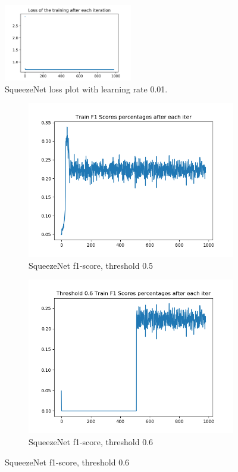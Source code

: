 \begin{figure}[!ht]
\centering
\includegraphics[width=0.5\textwidth]{squeezenet-lazy-1-train-loss.png}
\caption{\label{squeezenet:squeezenet-lazy-1-train-loss}SqueezeNet loss plot with learning rate 0.01.}
\end{figure}

\begin{figure}[!ht]
\centering
\begin{subfigure}{.5\textwidth}
	\centering
	\includegraphics[width=1\linewidth]{squeezenet-lazy-1-train-scores-f1.png}
	\caption{\label{squeezenet:squeezenet-lazy-1-train-scores-f1}SqueezeNet f1-score, threshold 0.5}
\end{subfigure}%
\begin{subfigure}{.5\textwidth}
	\centering
	\includegraphics[width=1\linewidth]{squeezenet-lazy-1-train-scores-f1-6.png}
	\caption{\label{squeezenet:squeezenet-lazy-1-train-scores-f1-6}SqueezeNet f1-score, threshold 0.6}
\end{subfigure}
\end{figure}
